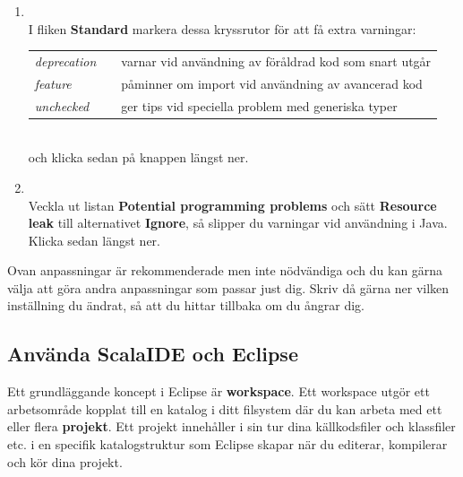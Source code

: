 \begin{enumerate}
\item  \EclipsePrefs{}
\\ I fliken \textbf{Standard} markera dessa kryssrutor för att få extra varningar: \\
\begin{tabular}{l @{}l @{}l}
\textit{deprecation} & \FramedCheckmark{} & varnar vid användning av föråldrad kod som snart utgår \\
\textit{feature}     & \FramedCheckmark{} & påminner om import vid användning av avancerad kod  \\
\textit{unchecked}   & \FramedCheckmark{} & ger tips vid speciella problem med generiska typer \\
\end{tabular}\\
och klicka sedan på knappen  längst ner.

\item \EclipsePrefs{}
\\ Veckla ut listan \textbf{Potential programming problems} och sätt \textbf{Resource leak} till alternativet \textbf{Ignore}, så slipper du varningar vid användning  i Java. Klicka sedan  längst ner.

\end{enumerate}

\noindent Ovan anpassningar är rekommenderade men inte nödvändiga och du kan gärna välja att göra andra anpassningar som passar just dig. Skriv då gärna ner vilken inställning du ändrat, så att du hittar tillbaka om du ångrar dig.




\subsection{Använda ScalaIDE och Eclipse}\label{appendix:ide:eclipse:use}

Ett grundläggande koncept i Eclipse är \textbf{workspace}. Ett workspace utgör ett arbetsområde kopplat till en katalog i ditt filsystem där du kan arbeta med ett eller flera \textbf{projekt}. Ett projekt innehåller i sin tur dina källkodsfiler och klassfiler etc. i en specifik katalogstruktur som Eclipse skapar när du editerar, kompilerar och kör dina projekt.

